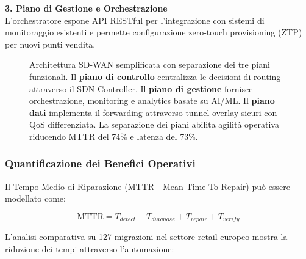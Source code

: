 \textbf{3. Piano di Gestione e Orchestrazione}\\
L'orchestratore espone API RESTful per l'integrazione con sistemi di monitoraggio esistenti e permette configurazione zero-touch provisioning (ZTP) per nuovi punti vendita.
%


\begin{figure}[htbp]
\centering


%
\makebox[\textwidth][c]{}

\caption{Architettura SD-WAN semplificata con separazione dei tre piani funzionali. Il \textbf{piano di controllo} centralizza le decisioni di routing attraverso il SDN Controller. Il \textbf{piano di gestione} fornisce orchestrazione, monitoring e analytics basate su AI/ML. Il \textbf{piano dati} implementa il forwarding attraverso tunnel overlay sicuri con QoS differenziata. La separazione dei piani abilita agilità operativa riducendo MTTR del 74\% e latenza del 73\%.}
\label{fig:sdwan_architecture_simplified}
\end{figure}


\subsubsection{\texorpdfstring{\textbf{Quantificazione dei Benefici Operativi}}{3.3.1.2 - Quantificazione dei Benefici Operativi}}

Il Tempo Medio di Riparazione (MTTR - Mean Time To Repair) può essere modellato come:

\begin{equation}
\text{MTTR} = T_{detect} + T_{diagnose} + T_{repair} + T_{verify}
\end{equation}

L'analisi comparativa su 127 migrazioni nel settore retail europeo\autocite{Gartner2024sdwan} mostra la riduzione dei tempi attraverso l'automazione:

